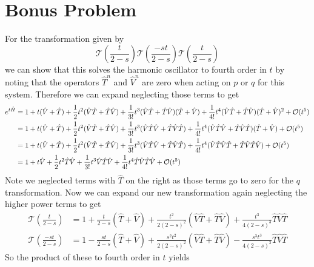 \documentclass[11pt]{article}
\numberwithin{equation}{section}
\begin{document}
\pagebreak

\section*{Bonus Problem}
For the transformation given by
$$\mathcal{T}\left(\frac{t}{2-s}\right)\mathcal{T}\left(\frac{-st}{2-s}\right)\mathcal{T}\left(\frac{t}{2-s}\right)$$
we can show that this solves the harmonic oscillator to fourth order in $t$ by noting that 
the operators $\hat{T}^n$ and $\hat{V}^n$ are zero when acting on $p$ or $q$ for this system.
Therefore we can expand neglecting those terms to get
\begin{align*}
e^{t\hat{H}} &= 1 + t(\hat{V}+\hat{T}) + \frac{1}{2}t^2(\hat{V}\hat{T} + \hat{T}\hat{V}) + \frac{1}{3!}t^3(\hat{V}\hat{T} + \hat{T}\hat{V})(\hat{T}+\hat{V}) +  \frac{1}{4!}t^4(\hat{V}\hat{T} + \hat{T}\hat{V})(\hat{T}+\hat{V})^2 + \mathcal{O}(t^5)\\
&= 1 + t(\hat{V}+\hat{T}) + \frac{1}{2}t^2(\hat{V}\hat{T} + \hat{T}\hat{V}) + \frac{1}{3!}t^3(\hat{V}\hat{T}\hat{V} + \hat{T}\hat{V}\hat{T}) +  \frac{1}{4!}t^4(\hat{V}\hat{T}\hat{V} + \hat{T}\hat{V}\hat{T})(\hat{T}+\hat{V}) + \mathcal{O}(t^5)\\
&= 1 + t(\hat{V}+\hat{T}) + \frac{1}{2}t^2(\hat{V}\hat{T} + \hat{T}\hat{V}) + \frac{1}{3!}t^3(\hat{V}\hat{T}\hat{V} + \hat{T}\hat{V}\hat{T}) +  \frac{1}{4!}t^4(\hat{V}\hat{T}\hat{V}\hat{T} + \hat{T}\hat{V}\hat{T}\hat{V}) + \mathcal{O}(t^5)\\
&= 1 + t\hat{V} + \frac{1}{2}t^2\hat{T}\hat{V} + \frac{1}{3!}t^3\hat{V}\hat{T}\hat{V} +  \frac{1}{4!}t^4\hat{T}\hat{V}\hat{T}\hat{V} + \mathcal{O}(t^5)
\end{align*}
Note we neglected terms with $\hat{T}$ on the right as those terms go to zero for the $q$ 
transformation.
Now we can expand our new transformation again neglecting the higher power terms to get
\begin{align*}
\mathcal{T}\left(\frac{t}{2-s}\right) & = 1 + \frac{t}{2-s}(\hat{T}+\hat{V}) + \frac{t^2}{2(2-s)^2}(\hat{V}\hat{T}+\hat{T}\hat{V}) + \frac{t^3}{4(2-s)^3}\hat{T}\hat{V}\hat{T}\\
\mathcal{T}\left(\frac{-st}{2-s}\right) & = 1 - \frac{st}{2-s}(\hat{T}+\hat{V}) + \frac{s^2t^2}{2(2-s)^2}(\hat{V}\hat{T}+\hat{T}\hat{V}) - \frac{s^3t^3}{4(2-s)^3}\hat{T}\hat{V}\hat{T}
\end{align*}
So the product of these to fourth order in $t$ yields
\end{document}
